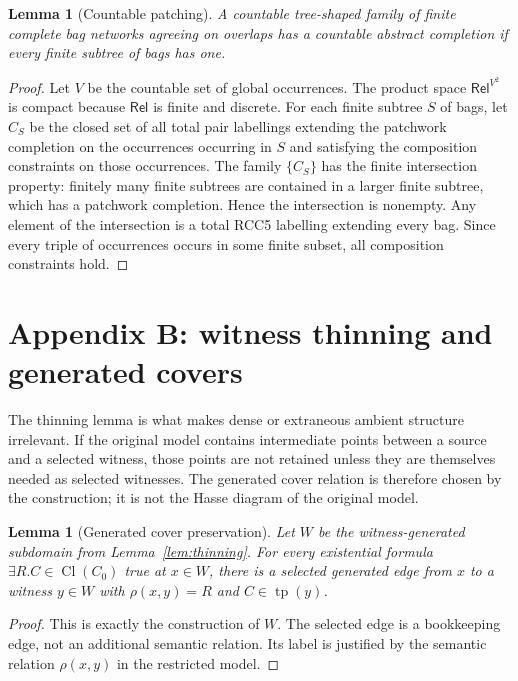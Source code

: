 \documentclass[11pt]{article}
\newtheorem{lemma}[theorem]{Lemma}
\newcommand{\Rel}{\mathsf{Rel}}
\newcommand{\Cl}{\operatorname{Cl}}
\newcommand{\tp}{\operatorname{tp}}
\begin{document}
\begin{lemma}[Countable patching]
A countable tree-shaped family of finite complete bag networks agreeing on overlaps has a countable abstract completion if every finite subtree of bags has one.
\end{lemma}

\begin{proof}
Let $V$ be the countable set of global occurrences.  The product space $\Rel^{V^2}$ is compact because $\Rel$ is finite and discrete.  For each finite subtree $S$ of bags, let $C_S$ be the closed set of all total pair labellings extending the patchwork completion on the occurrences occurring in $S$ and satisfying the composition constraints on those occurrences.  The family $\{C_S\}$ has the finite intersection property: finitely many finite subtrees are contained in a larger finite subtree, which has a patchwork completion.  Hence the intersection is nonempty.  Any element of the intersection is a total RCC5 labelling extending every bag.  Since every triple of occurrences occurs in some finite subset, all composition constraints hold.
\end{proof}

\section{Appendix B: witness thinning and generated covers}

The thinning lemma is what makes dense or extraneous ambient structure irrelevant.  If the original model contains intermediate points between a source and a selected witness, those points are not retained unless they are themselves needed as selected witnesses.  The generated cover relation is therefore chosen by the construction; it is not the Hasse diagram of the original model.

\begin{lemma}[Generated cover preservation]
Let $W$ be the witness-generated subdomain from Lemma~\ref{lem:thinning}.  For every existential formula $\exists R.C\in\Cl(C_0)$ true at $x\in W$, there is a selected generated edge from $x$ to a witness $y\in W$ with $\rho(x,y)=R$ and $C\in\tp(y)$.
\end{lemma}

\begin{proof}
This is exactly the construction of $W$.  The selected edge is a bookkeeping edge, not an additional semantic relation.  Its label is justified by the semantic relation $\rho(x,y)$ in the restricted model.
\end{proof}
\end{document}
